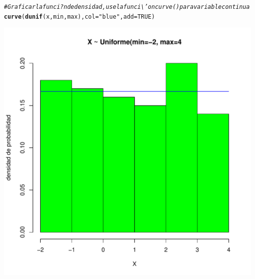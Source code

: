 \documentclass[12pt,letterpaper]{article}\usepackage[]{graphicx}\usepackage[]{color}
\makeatletter
\def\maxwidth{ %
  \ifdim\Gin@nat@width>\linewidth
    \linewidth
  \else
    \Gin@nat@width
  \fi
}
\newcommand{\hlnum}[1]{\textcolor[rgb]{0.686,0.059,0.569}{#1}}%
\newcommand{\hlstr}[1]{\textcolor[rgb]{0.192,0.494,0.8}{#1}}%
\newcommand{\hlcom}[1]{\textcolor[rgb]{0.678,0.584,0.686}{\textit{#1}}}%
\newcommand{\hlstd}[1]{\textcolor[rgb]{0.345,0.345,0.345}{#1}}%
\newcommand{\hlkwc}[1]{\textcolor[rgb]{0.333,0.667,0.333}{#1}}%
\newcommand{\hlkwd}[1]{\textcolor[rgb]{0.737,0.353,0.396}{\textbf{#1}}}%
\newenvironment{kframe}{%
 \def\at@end@of@kframe{}%
 \ifinner\ifhmode%
  \def\at@end@of@kframe{\end{minipage}}%
  \begin{minipage}{\columnwidth}%
 \fi\fi%
 \def\FrameCommand##1{\hskip\@totalleftmargin \hskip-\fboxsep
 \colorbox{shadecolor}{##1}\hskip-\fboxsep
     \hskip-\linewidth \hskip-\@totalleftmargin \hskip\columnwidth}%
 \MakeFramed {\advance\hsize-\width
   \@totalleftmargin\z@ \linewidth\hsize
   \@setminipage}}%
 {\par\unskip\endMakeFramed%
 \at@end@of@kframe}
\newenvironment{knitrout}{}{} %
\makeatother
\begin{document}
\begin{knitrout}
\begin{kframe}
\begin{alltt}
\hlcom{# Graficar la funci?n de densidad, use la funci\textbackslash{}'on curve() para variable continua }
\hlkwd{curve}\hlstd{(}\hlkwd{dunif}\hlstd{(x, min, max),} \hlkwc{col}\hlstd{=}\hlstr{"blue"}\hlstd{,} \hlkwc{add}\hlstd{=}\hlnum{TRUE}\hlstd{)}
\end{alltt}
\end{kframe}
\includegraphics[width=\maxwidth]{figure/unnamed-chunk-15-1} 

\end{knitrout}
\end{document}

